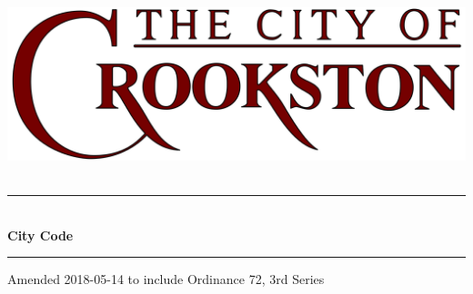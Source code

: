 \begin{titlepage}
\begin{center}

~\\[3cm]
\includegraphics[width=.75\textwidth]{./images/crookston_logo.png}~\\[2.5cm]

\hrule ~\\[0.4cm]
{\Huge\bfseries City Code}\\[0.4cm]
\hrule

\vfill

{\large Amended 2018-05-14 to include}
{\large Ordinance 72, 3rd Series}

\end{center}
\end{titlepage}
